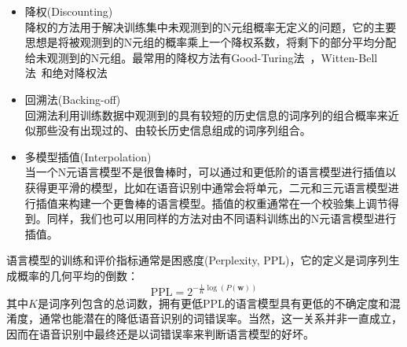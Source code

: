 \begin{itemize}
    \item 降权(Discounting) \\
    降权的方法用于解决训练集中未观测到的N元组概率无定义的问题，它的主要思想是将被观测到的N元组的概率乘上一个降权系数，将剩下的部分平均分配给未观测到的N元组。最常用的降权方法有Good-Turing法~\cite{good1953population,katz1987estimation}，Witten-Bell法~\cite{witten1991zero}和绝对降权法~\cite{ney1995estimation}
    \item 回溯法(Backing-off) \\
    回溯法利用训练数据中观测到的具有较短的历史信息的词序列的组合概率来近似那些没有出现过的、由较长历史信息组成的词序列组合。
    \item 多模型插值(Interpolation) \\
    当一个N元语言模型不是很鲁棒时，可以通过和更低阶的语言模型进行插值以获得更平滑的模型，比如在语音识别中通常会将单元，二元和三元语言模型进行插值来构建一个更鲁棒的语言模型。插值的权重通常在一个校验集上调节得到。同样，我们也可以用同样的方法对由不同语料训练出的N元语言模型进行插值。
\end{itemize}
语言模型的训练和评价指标通常是困惑度(Perplexity, PPL)，它的定义是词序列生成概率的几何平均的倒数：
\begin{equation}
    \text{PPL}=2^{-\frac{1}{K}\log(P(\mathbf{w}))}
\end{equation}
其中$K$是词序列包含的总词数，拥有更低PPL的语言模型具有更低的不确定度和混淆度，通常也能潜在的降低语音识别的词错误率。当然，这一关系并非一直成立，因而在语音识别中最终还是以词错误率来判断语言模型的好坏。

